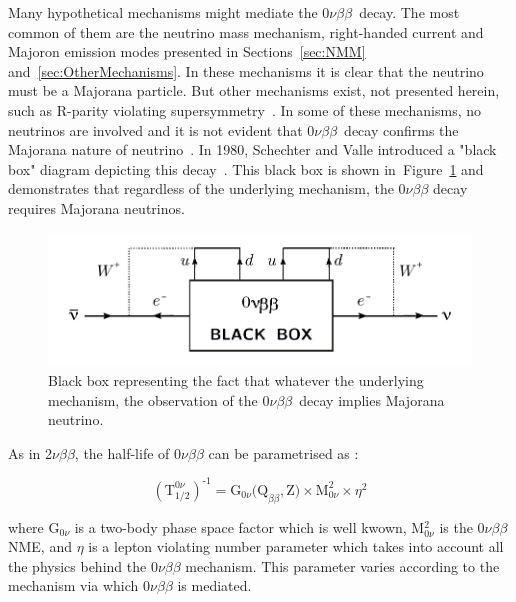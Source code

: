 \documentclass[main.tex]{subfiles}
\begin{document}
\bigskip



\NI Many hypothetical mechanisms might mediate the 0$\nu\beta\beta$~decay. The most common of them are the neutrino mass mechanism, right-handed current and Majoron emission modes presented in Sections~\ref{sec:NMM} and~\ref{sec:OtherMechanisms}. In these mechanisms it is clear that the neutrino must be a Majorana particle. But other mechanisms exist, not presented herein, such as R-parity violating supersymmetry~\cite{SUSYandDBD}. In some of these mechanisms, no neutrinos are involved and it is not evident that 0$\nu\beta\beta$~decay confirms the Majorana nature of neutrino~\cite{SUSYandDBD}. In 1980, Schechter and Valle introduced a "black box" diagram depicting this decay~\cite{SchechterValle}. This black box is shown in~Figure~\ref{0nubbBlackBox} and demonstrates that regardless of the underlying mechanism, the 0$\nu\beta\beta$ decay requires Majorana neutrinos.  


\smallskip

\begin{figure}[h!]
\begin{center}
\includegraphics[scale=0.75]{pictures/Chap2/0nubbBlackBox.pdf}
\caption{Black box representing the fact that whatever the underlying mechanism, the observation of the 0$\nu\beta\beta$~decay implies Majorana neutrino.}
\label{0nubbBlackBox}
\end{center}
\end{figure}


\bigskip


\NI As in 2$\nu\beta\beta$, the half-life of 0$\nu\beta\beta$ can be parametrised as : 


\begin{equation}\label{eq:halflife0nu}
(\text{T}_{\text{1/2}}^{\text{0}\nu})^{\text{-1}} = \text{G}_{\text{0}\nu}\text{(Q}_{\beta\beta},\text{Z)} \times \text{M}^\text{2}_{\text{0}\nu} \times \eta^\text{2}
\end{equation}


\bigskip


\NI where G$_{\text{0}\nu}$ is a two-body phase space factor which is well kwown, M$^\text{2}_{\text{0}\nu}$ is the 0$\nu\beta\beta$ NME, and $\eta$ is a lepton violating number parameter which takes into account all the physics behind the 0$\nu\beta\beta$ mechanism. This parameter varies according to the mechanism via which 0$\nu\beta\beta$ is mediated.  
\end{document}
